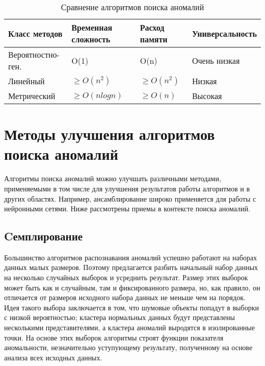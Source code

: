 \begin{table}[!h]
	
	\caption{\label{tab:collectdata}Сравнение алгоритмов поиска аномалий}
	
	\begin{center}
		
		\begin{tabular}{|l|l|l|l|}
			
			\hline
			
			Класс методов & Временная сложность & Расход памяти & Универсальность \\
			
			\hline \hline
			
			Вероятностно-ген.& O(1) &  O(n) & Очень низкая \\
			
			
			\hline
			
			Линейный &  $\ge O(n^2)$ &  $\ge O(n^2)$ & Низкая\\
			
			
		
			\hline
			Метрический & $\ge O(nlogn)$ & $\ge O(n)$ & Высокая\\
			
			
			\hline
			
			
		\end{tabular}
		
	\end{center}
	
\end{table}                               



\section{Методы улучшения алгоритмов поиска аномалий}
Алгоритмы поиска аномалий можно улучшать различными методами, применяемыми в том числе для  улучшения результатов работы алгоритмов и в других областях. Например, ансамблирование широко применяется для работы с нейронными сетями. Ниже рассмотрены приемы в контексте поиска аномалий.
\subsection{Cемплирование}
Большинство алгоритмов распознавания аномалий успешно работают на наборах данных малых размеров. Поэтому предлагается разбить начальный набор данных на несколько случайных выборок и усреднить результат. Размер этих выборок может быть как и случайным, там и фиксированного размера, но, как правило, он отличается от размеров исходного набора данных не меньше чем на порядок. Идея такого выбора заключается в том, что шумовые объекты попадут в выборки с низкой вероятностью; кластера нормальных данных будут представлены несколькими представителями, а кластера аномалий выродятся в изолированные точки. На основе этих выборок алгоритмы строят функции показателя аномальности, незначительно уступующему результату, полученному на основе анализа всех исходных данных. 

